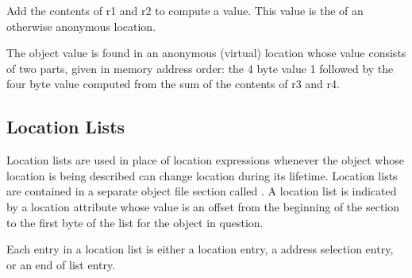 \begin{description}
Add the contents of r1 and r2 to compute a value. This value is the
 of an otherwise anonymous location.

The object value is found in an anonymous (virtual) location whose
value consists of two parts, given in memory address order: the 4 byte
value 1 followed by the four byte value computed from the sum of the
contents of r3 and r4.
\end{description}


\subsection{Location Lists}
\label{chap:locationlists}
Location lists 
are used in place of location expressions
whenever the object whose location is being described
can change location during its lifetime. 
Location lists
are contained in a separate object file section called
. A location list is indicated by a location
attribute whose value is an offset from the beginning of
the  section to the first byte of the list for the
object in question.

Each entry in a location list is either a location 
entry,
a 
address selection entry, 
or an 
end of list entry.

